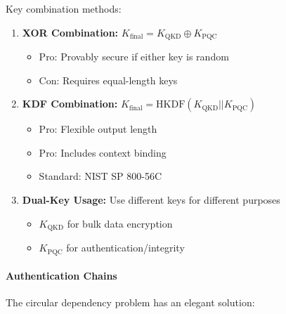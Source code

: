 \documentclass[11pt,a4paper]{article}
\begin{document}
Key combination methods:

\begin{enumerate}
    \item \textbf{XOR Combination:} $K_{\text{final}} = K_{\text{QKD}} \oplus K_{\text{PQC}}$
    \begin{itemize}
        \item Pro: Provably secure if either key is random
        \item Con: Requires equal-length keys
    \end{itemize}
    
    \item \textbf{KDF Combination:} $K_{\text{final}} = \text{HKDF}(K_{\text{QKD}} || K_{\text{PQC}})$
    \begin{itemize}
        \item Pro: Flexible output length
        \item Pro: Includes context binding
        \item Standard: NIST SP 800-56C
    \end{itemize}
    
    \item \textbf{Dual-Key Usage:} Use different keys for different purposes
    \begin{itemize}
        \item $K_{\text{QKD}}$ for bulk data encryption
        \item $K_{\text{PQC}}$ for authentication/integrity
    \end{itemize}
\end{enumerate}

\paragraph{Authentication Chains}

The circular dependency problem has an elegant solution:
\end{document}
